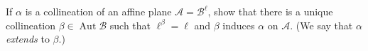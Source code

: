 If $\alpha$ is a collineation of an affine plane $\mathcal{A} = \mathcal{B}^\ell$, show that there is a unique collineation $\beta \in \operatorname{Aut}\mathcal{B}$ such that $\ell^\beta = \ell$ and $\beta$ induces $\alpha$ on $\mathcal{A}$. (We say that $\alpha$ \emph{extends} to $\beta$.)
